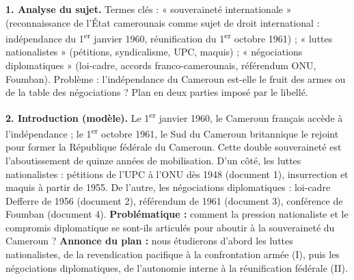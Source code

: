 \documentclass[11pt]{article}
\begin{document}
\begin{corrige}
\textbf{1. Analyse du sujet.} Termes clés : « souveraineté internationale » (reconnaissance de l'État camerounais comme sujet de droit international : indépendance du 1\textsuperscript{er} janvier 1960, réunification du 1\textsuperscript{er} octobre 1961) ; « luttes nationalistes » (pétitions, syndicalisme, UPC, maquis) ; « négociations diplomatiques » (loi-cadre, accords franco-camerounais, référendum ONU, Foumban). Problème : l'indépendance du Cameroun est-elle le fruit des armes ou de la table des négociations ? Plan en deux parties imposé par le libellé.

\textbf{2. Introduction (modèle).} Le 1\textsuperscript{er} janvier 1960, le Cameroun français accède à l'indépendance ; le 1\textsuperscript{er} octobre 1961, le Sud du Cameroun britannique le rejoint pour former la République fédérale du Cameroun. Cette double souveraineté est l'aboutissement de quinze années de mobilisation. D'un côté, les luttes nationalistes : pétitions de l'UPC à l'ONU dès 1948 (document 1), insurrection et maquis à partir de 1955. De l'autre, les négociations diplomatiques : loi-cadre Defferre de 1956 (document 2), référendum de 1961 (document 3), conférence de Foumban (document 4). \textbf{Problématique :} comment la pression nationaliste et le compromis diplomatique se sont-ils articulés pour aboutir à la souveraineté du Cameroun ? \textbf{Annonce du plan :} nous étudierons d'abord les luttes nationalistes, de la revendication pacifique à la confrontation armée (I), puis les négociations diplomatiques, de l'autonomie interne à la réunification fédérale (II).


\end{corrige}
\end{document}
